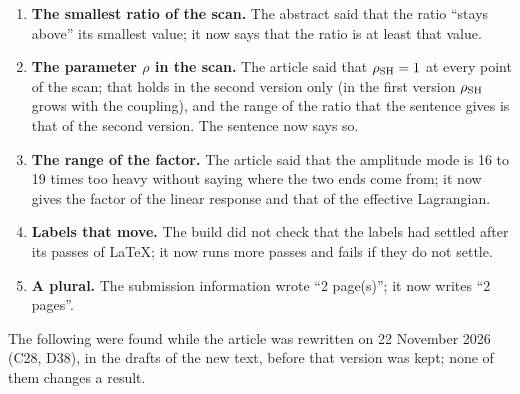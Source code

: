 \documentclass[
  10pt,
]{article}
\begin{document}
\begin{enumerate}
  cited the document of the hypotheses and equations of the manuscripts
  of the stages; the build replaces them (Section 4).
\item
  \textbf{The smallest ratio of the scan.} The abstract said that the
  ratio ``stays above'' its smallest value; it now says that the ratio
  is at least that value.
\item
  \textbf{The parameter \(\rho\) in the scan.} The article said that
  \(\rho_{\rm SH}=1\) at every point of the scan; that holds in the
  second version only (in the first version \(\rho_{\rm SH}\) grows with
  the coupling), and the range of the ratio that the sentence gives is
  that of the second version. The sentence now says so.
\item
  \textbf{The range of the factor.} The article said that the amplitude
  mode is 16 to 19 times too heavy without saying where the two ends
  come from; it now gives the factor of the linear response and that of
  the effective Lagrangian.
\item
  \textbf{Labels that move.} The build did not check that the labels had
  settled after its passes of LaTeX; it now runs more passes and fails
  if they do not settle.
\item
  \textbf{A plural.} The submission information wrote ``2 page(s)''; it
  now writes ``2 pages''.
\end{enumerate}

The following were found while the article was rewritten on 22 November
2026 (C28, D38), in the drafts of the new text, before that version was
kept; none of them changes a result.
\end{document}
